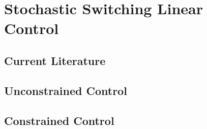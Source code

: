 \section{Stochastic Switching Linear Control}

\subsection{Current Literature}

\subsection{Unconstrained Control}

\subsection{Constrained Control}

